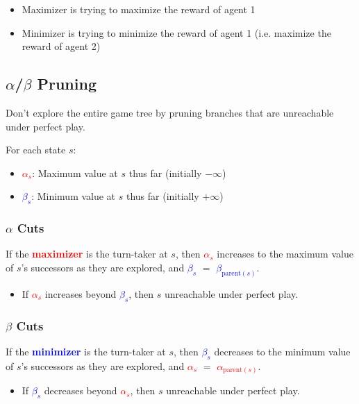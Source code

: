 \begin{warning}
    \begin{itemize}
        \item Maximizer is trying to maximize the reward of agent 1
        \item Minimizer is trying to minimize the reward of agent 1 (i.e. maximize the reward of agent 2)
    \end{itemize}
\end{warning}

\subsection{$\alpha$/$\beta$ Pruning}
\begin{motivation}
    Don't explore the entire game tree by pruning branches that are unreachable under perfect play.
\end{motivation}
\begin{definition}
    For each state $s$: 
    \begin{itemize}
        \item \textcolor{red}{$\alpha_s$}: Maximum value at $s$ thus far (initially $-\infty$)
        \item \textcolor{blue}{$\beta_s$}: Minimum value at $s$ thus far (initially $+\infty$)
    \end{itemize}
\end{definition}

\subsubsection{$\alpha$ Cuts}
\begin{definition}
    If the \textcolor{red}{\textbf{maximizer}} is the turn-taker at $s$, then \textcolor{red}{$\alpha_s$} increases to the maximum value of $s$'s successors as they are explored, and \textcolor{blue}{$\beta_s$} $=$ \textcolor{blue}{$\beta_{\text{parent}(s)}$}.
    \begin{itemize}
        \item If \textcolor{red}{$\alpha_s$} increases beyond \textcolor{blue}{$\beta_s$}, then $s$ unreachable under perfect play.
    \end{itemize}
\end{definition}

\subsubsection{$\beta$ Cuts}
\begin{definition}
    If the \textcolor{blue}{\textbf{minimizer}} is the turn-taker at $s$, then \textcolor{blue}{$\beta_s$} decreases to the minimum value of $s$'s successors as they are explored, and \textcolor{red}{$\alpha_s$} $=$ \textcolor{red}{$\alpha_{\text{parent}(s)}$}.
    \begin{itemize}
        \item If \textcolor{blue}{$\beta_s$} decreases beyond \textcolor{red}{$\alpha_s$}, then $s$ unreachable under perfect play. 
    \end{itemize}
\end{definition}
\newpage

